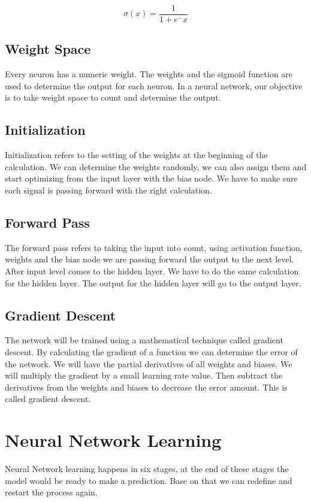 \documentclass[12pt]{article}
\begin{document}
\[\sigma (x) =\frac{1}{1 + e^-x}\]
\label{eq:sigmoid}


\subsection{Weight Space}
Every neuron has a numeric weight. The weights and the sigmoid function are used to determine the output for each neuron. In a neural network, our objective is to take weight space to count and determine the output.

\subsection{Initialization}
Initialization refers to the setting of the weights at the beginning of the calculation. We can determine the weights randomly, we can also assign them and start optimizing from the input layer with the bias node. We have to make sure each signal is passing forward with the right calculation.

\subsection{Forward Pass}
The forward pass refers to taking the input into count, using activation function, weights and the bias node we are passing forward the output to the next level. After input level comes to the hidden layer. We have to do the same calculation for the hidden layer. The output for the hidden layer will go to the output layer.

\subsection{Gradient Descent}
The network will be trained using a mathematical technique called gradient descent. By calculating the gradient of a function we can determine the error of the network. We will have the partial derivatives of all weights and biases. We will multiply the gradient by a small learning rate value. Then subtract the derivatives from the weights and biases to decrease the error amount. This is called gradient descent.



\section{Neural Network Learning}
Neural Network learning happens in six stages, at the end of these stages the model would be ready to make a prediction. Base on that we can redefine and restart the process again. 
\end{document}
